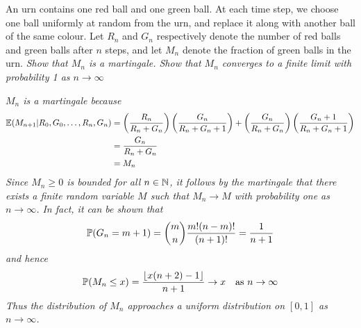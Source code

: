 \begin{exercise}
An urn contains one red ball and one green ball. At each time step, we choose one ball uniformly at random from the urn, and replace it along with another ball of the same colour. Let $R_n$ and $G_n$ respectively denote the number of red balls and green balls after $n$ steps, and let $M_n$ denote the fraction of green balls in the urn.
\ben
\it Show that $M_n$ is a martingale.
\it Show that $M_n$ converges to a finite limit with probability 1 as $n\to\infty$
\een
\begin{answer}
\ben
\it %
$M_n$ is a martingale because
\begin{align*}
\mathbb{E}(M_{n+1} | R_0,G_0,\ldots,R_n,G_n)
	& = \left(\frac{R_n}{R_n+G_n}\right)\left(\frac{G_n}{R_n+G_n+1}\right)
	  + \left(\frac{G_n}{R_n+G_n}\right)\left(\frac{G_n+1}{R_n+G_n+1}\right) \\
	& = \frac{G_n}{R_n+G_n} \\
	& = M_n
\end{align*}		
\it %
Since $M_n\geq 0$ is bounded for all $n\in\mathbb{N}$, it follows by the martingale that there exists a finite random variable $M$ such that $M_n\to M$ with probability one as $n\to\infty$. In fact, it can be shown that
\[
\mathbb{P}(G_n = m+1) = \binom{m}{n}\frac{m!(n-m)!}{(n+1)!} = \frac{1}{n+1}
\]
and hence
\[
\mathbb{P}(M_n\leq x) = \frac{\lfloor x(n+2)-1\rfloor}{n+1} \to x \quad\text{as }n\to\infty
\]
Thus the distribution of $M_n$ approaches a uniform distribution on $[0,1]$ as $n\to\infty$.
\een
\end{answer}
\end{exercise}

\endinput
